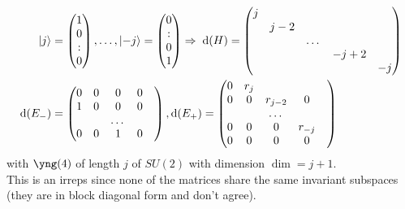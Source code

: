 \begin{align*}
	\ket{j}&= \begin{pmatrix}
	1\\
	0\\
	:\\
	0\\
	\end{pmatrix},
\dots,
	\ket{-j}=
	\begin{pmatrix}
		0\\
		:\\
		0\\
		1\\
	\end{pmatrix}
\Rightarrow\;
\mathrm{d}(H) = \begin{pmatrix}
	j & & & & \\
	&j-2&&& \\
	&&\dots &&\\
	&&&-j+2&\\
	&&&&-j\\
\end{pmatrix}
\\
\mathrm{d}(E_-)&= \begin{pmatrix}
	0&0&0&0\\
	1&0&0&0\\
	&&\dots&&\\
	0&0&1&0\\
\end{pmatrix},
\mathrm{d}(E_+) = 
\begin{pmatrix}
	0&r_j&&&\\
	0&0&r_{j-2}&0&\\
	&&\dots&&\\
	0&0&0&r_{-j}\\
	0&0&0&0\\
\end{pmatrix}
\end{align*}
with $\yng(4)$ of length $j$ of $SU(2)$ with dimension $\dim=j+1$.\\
This is an irreps since none of the matrices share the same invariant subspaces (they are in block diagonal form and don't agree).
\\
